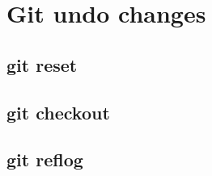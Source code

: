 \section{Git undo changes}
\begin{frame}[fragile]
    \slidetitle
\end{frame}

\subsection{git reset}
\begin{frame}[fragile]
    \subslidetitle
\end{frame}

\subsection{git checkout}
\begin{frame}[fragile]
    \subslidetitle
\end{frame}

\subsection{git reflog}
\begin{frame}[fragile]
    \subslidetitle
\end{frame}

